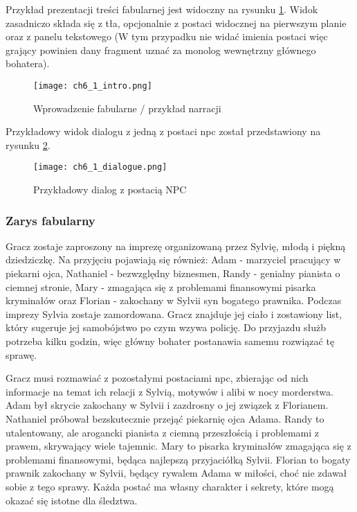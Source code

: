 \newpage
Przykład prezentacji treści fabularnej jest widoczny na rysunku \ref{fig:ch6_1_intro}. Widok
zasadniczo składa się z tła, opcjonalnie z postaci widocznej na pierwszym planie oraz z panelu
tekstowego (W tym przypadku nie widać imienia postaci więc grający powinien dany fragment uznać
za monolog wewnętrzny głównego bohatera).

\begin{figure}[h!]
    \centering
    \texttt{[image: ch6\_1\_intro.png]}
    \caption{Wprowadzenie fabularne / przykład narracji}
    \label{fig:ch6_1_intro}
\end{figure}

Przykładowy widok dialogu z jedną z postaci \gls{npc} został przedstawiony na rysunku \ref{fig:ch6_1_dialogue}.

\begin{figure}[h!]
    \centering
    \texttt{[image: ch6\_1\_dialogue.png]}
    \caption{Przykładowy dialog z postacią NPC}
    \label{fig:ch6_1_dialogue}
\end{figure}

\subsubsection*{Zarys fabularny}

Gracz zostaje zaproszony na imprezę organizowaną przez Sylvię, młodą i piękną dziedziczkę. Na
przyjęciu pojawiają się również: Adam - marzyciel pracujący w piekarni ojca, Nathaniel -
bezwzględny biznesmen, Randy - genialny pianista o ciemnej stronie, Mary - zmagająca się z
problemami finansowymi pisarka kryminałów oraz Florian - zakochany w Sylvii syn bogatego prawnika.
Podczas imprezy Sylvia zostaje zamordowana. Gracz znajduje jej ciało i zostawiony list, który
sugeruje jej samobójstwo po czym wzywa policję. Do przyjazdu służb potrzeba kilku godzin, więc
główny bohater postanawia samemu rozwiązać tę sprawę.

Gracz musi rozmawiać z pozostałymi postaciami \gls{npc}, zbierając od nich informacje na temat ich
relacji z Sylvią, motywów i alibi w nocy morderstwa. Adam był skrycie zakochany w Sylvii i
zazdrosny o jej związek z Florianem. Nathaniel próbował bezskutecznie przejąć piekarnię ojca Adama.
Randy to utalentowany, ale arogancki pianista z ciemną przeszłością i problemami z prawem,
skrywający wiele tajemnic. Mary to pisarka kryminałów zmagająca się z problemami finansowymi,
będąca najlepszą przyjaciółką Sylvii. Florian to bogaty prawnik zakochany w Sylvii, będący rywalem
Adama w miłości, choć nie zdawał sobie z tego sprawy. Każda postać ma własny charakter i sekrety,
które mogą okazać się istotne dla śledztwa.

